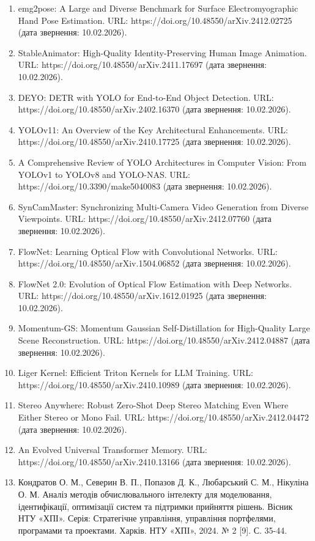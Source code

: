 \documentclass[
]{article}
\begin{document}
\begin{enumerate}
\item
  emg2pose: A Large and Diverse Benchmark for Surface Electromyographic Hand Pose Estimation. URL: https://doi.org/10.48550/arXiv.2412.02725 (дата звернення: 10.02.2026).
\item
  \protect{}\label{_Ref221609081}{}StableAnimator: High-Quality Identity-Preserving Human Image Animation. URL: https://doi.org/10.48550/arXiv.2411.17697 (дата звернення: 10.02.2026).
\item
  DEYO: DETR with YOLO for End-to-End Object Detection. URL: https://doi.org/10.48550/arXiv.2402.16370 (дата звернення: 10.02.2026).
\item
  YOLOv11: An Overview of the Key Architectural Enhancements. URL: https://doi.org/10.48550/arXiv.2410.17725 (дата звернення: 10.02.2026).
\item
  A Comprehensive Review of YOLO Architectures in Computer Vision: From YOLOv1 to YOLOv8 and YOLO-NAS. URL: https://doi.org/10.3390/make5040083 (дата звернення: 10.02.2026).
\item
  SynCamMaster: Synchronizing Multi-Camera Video Generation from Diverse Viewpoints. URL: https://doi.org/10.48550/arXiv.2412.07760 (дата звернення: 10.02.2026).
\item
  \protect{}\label{_Ref227232205}{}FlowNet: Learning Optical Flow with Convolutional Networks. URL: https://doi.org/10.48550/arXiv.1504.06852 (дата звернення: 10.02.2026).
\item
  FlowNet 2.0: Evolution of Optical Flow Estimation with Deep Networks. URL: https://doi.org/10.48550/arXiv.1612.01925 (дата звернення: 10.02.2026).
\item
  Momentum-GS: Momentum Gaussian Self-Distillation for High-Quality Large Scene Reconstruction. URL: https://doi.org/10.48550/arXiv.2412.04887 (дата звернення: 10.02.2026).
\item
  Liger Kernel: Efficient Triton Kernels for LLM Training. URL: https://doi.org/10.48550/arXiv.2410.10989 (дата звернення: 10.02.2026).
\item
  Stereo Anywhere: Robust Zero-Shot Deep Stereo Matching Even Where Either Stereo or Mono Fail. URL: https://doi.org/10.48550/arXiv.2412.04472 (дата звернення: 10.02.2026).
\item
  An Evolved Universal Transformer Memory. URL: https://doi.org/10.48550/arXiv.2410.13166 (дата звернення: 10.02.2026).
\item
  Кондратов О. М., Северин В. П., Попазов Д. К., Любарський С. М., Нікуліна О. М. Аналіз методів обчислювального інтелекту для моделювання, ідентифікації, оптимізації систем та підтримки прийняття рішень. Вісник НТУ «ХПІ». Серія: Стратегічне управління, управління портфелями, програмами та проектами. Харків. НТУ «ХПІ», 2024. № 2 {[}9{]}. С. 35-44.

\end{enumerate}
\end{document}
